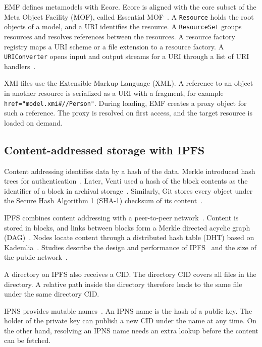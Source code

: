 \documentclass[5p,times,twocolumn]{elsarticle}
\theoremstyle{definition}
\theoremstyle{plain}
\begin{document}
EMF defines metamodels with Ecore. Ecore is aligned with the core subset of the Meta Object Facility (MOF), called Essential MOF~\cite{steinberg2008emf,omg2016mof}. A \texttt{Resource} holds the root objects of a model, and a URI identifies the resource. A \texttt{ResourceSet} groups resources and resolves references between the resources. A resource factory registry maps a URI scheme or a file extension to a resource factory. A \texttt{URIConverter} opens input and output streams for a URI through a list of URI handlers~\cite{steinberg2008emf}.

XMI files use the Extensible Markup Language (XML). A reference to an object in another resource is serialized as a URI with a fragment, for example \verb|href="model.xmi#//Person"|. During loading, EMF creates a proxy object for such a reference. The proxy is resolved on first access, and the target resource is loaded on demand.

\subsection{Content-addressed storage with IPFS}\label{sec:background-ipfs}

Content addressing identifies data by a hash of the data. Merkle introduced hash trees for authentication~\cite{merkle1988signature}. Later, Venti used a hash of the block contents as the identifier of a block in archival storage~\cite{quinlan2002venti}. Similarly, Git stores every object under the Secure Hash Algorithm 1 (SHA-1) checksum of its content~\cite{chacon2014progit}.

IPFS combines content addressing with a peer-to-peer network~\cite{benet2014ipfs}. Content is stored in blocks, and links between blocks form a Merkle directed acyclic graph (DAG)~\cite{benet2014ipfs}. Nodes locate content through a distributed hash table (DHT) based on Kademlia~\cite{maymounkov2002kademlia,psaras2020ipfs}. Studies describe the design and performance of IPFS~\cite{trautwein2022ipfs} and the size of the public network~\cite{henningsen2020mapping}.

A directory on IPFS also receives a CID. The directory CID covers all files in the directory. A relative path inside the directory therefore leads to the same file under the same directory CID.

IPNS provides mutable names~\cite{ipfsdocsipns}. An IPNS name is the hash of a public key. The holder of the private key can publish a new CID under the name at any time. On the other hand, resolving an IPNS name needs an extra lookup before the content can be fetched.
\end{document}
